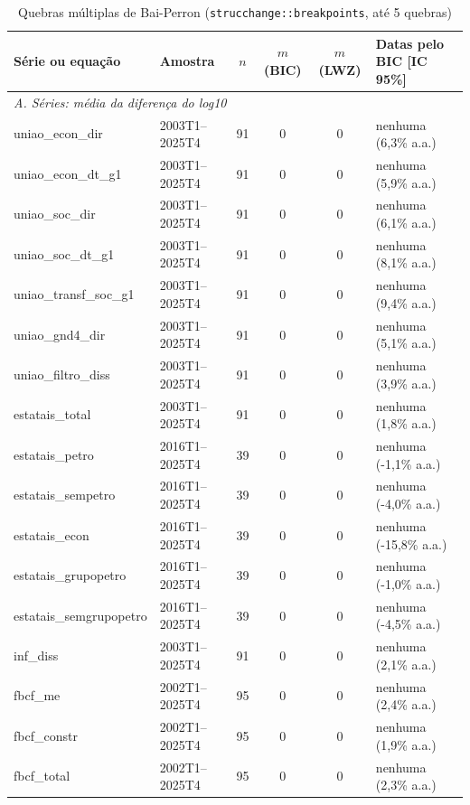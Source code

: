 \begin{table}[htbp]
\centering
\caption{Quebras m\'ultiplas de Bai-Perron (\texttt{strucchange::breakpoints}, at\'e 5 quebras)}
\label{tab:a4_bp}
\scriptsize
\begin{tabular}{llcccl}
\toprule
S\'erie ou equa\c{c}\~ao & Amostra & $n$ & $m$ (BIC) & $m$ (LWZ) & Datas pelo BIC [IC 95\%] \\
\midrule
\multicolumn{6}{l}{\textit{A. S\'eries: m\'edia da diferen\c{c}a do log10}} \\
uniao\_econ\_dir & 2003T1--2025T4 & 91 & 0 & 0 & nenhuma (6{,}3\% a.a.) \\
uniao\_econ\_dt\_g1 & 2003T1--2025T4 & 91 & 0 & 0 & nenhuma (5{,}9\% a.a.) \\
uniao\_soc\_dir & 2003T1--2025T4 & 91 & 0 & 0 & nenhuma (6{,}1\% a.a.) \\
uniao\_soc\_dt\_g1 & 2003T1--2025T4 & 91 & 0 & 0 & nenhuma (8{,}1\% a.a.) \\
uniao\_transf\_soc\_g1 & 2003T1--2025T4 & 91 & 0 & 0 & nenhuma (9{,}4\% a.a.) \\
uniao\_gnd4\_dir & 2003T1--2025T4 & 91 & 0 & 0 & nenhuma (5{,}1\% a.a.) \\
uniao\_filtro\_diss & 2003T1--2025T4 & 91 & 0 & 0 & nenhuma (3{,}9\% a.a.) \\
estatais\_total & 2003T1--2025T4 & 91 & 0 & 0 & nenhuma (1{,}8\% a.a.) \\
estatais\_petro & 2016T1--2025T4 & 39 & 0 & 0 & nenhuma (-1{,}1\% a.a.) \\
estatais\_sempetro & 2016T1--2025T4 & 39 & 0 & 0 & nenhuma (-4{,}0\% a.a.) \\
estatais\_econ & 2016T1--2025T4 & 39 & 0 & 0 & nenhuma (-15{,}8\% a.a.) \\
estatais\_grupopetro & 2016T1--2025T4 & 39 & 0 & 0 & nenhuma (-1{,}0\% a.a.) \\
estatais\_semgrupopetro & 2016T1--2025T4 & 39 & 0 & 0 & nenhuma (-4{,}5\% a.a.) \\
inf\_diss & 2003T1--2025T4 & 91 & 0 & 0 & nenhuma (2{,}1\% a.a.) \\
fbcf\_me & 2002T1--2025T4 & 95 & 0 & 0 & nenhuma (2{,}4\% a.a.) \\
fbcf\_constr & 2002T1--2025T4 & 95 & 0 & 0 & nenhuma (1{,}9\% a.a.) \\
fbcf\_total & 2002T1--2025T4 & 95 & 0 & 0 & nenhuma (2{,}3\% a.a.) \\

\end{tabular}
\end{table}
